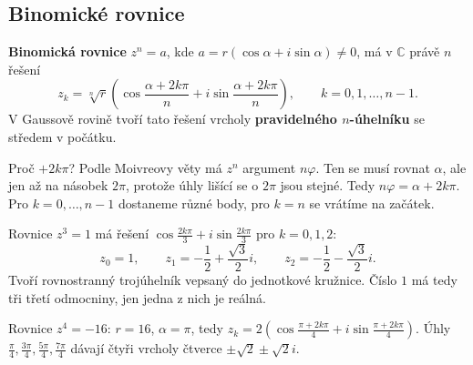 \subsection{Binomické rovnice}\label{sec:binomicke-rovnice}

\begin{definitionbox}
  \textbf{Binomická rovnice} $z^n = a$, kde $a = r(\cos\alpha + i\sin\alpha)\neq 0$, má v $\mathbb{C}$ právě $n$ řešení
  \begin{equation*}
    z_k = \sqrt[n]{r}\left(\cos\frac{\alpha + 2k\pi}{n} + i\sin\frac{\alpha + 2k\pi}{n}\right),\qquad k = 0, 1, \ldots, n - 1.
  \end{equation*}
  V Gaussově rovině tvoří tato řešení vrcholy \textbf{pravidelného $n$-úhelníku} se středem v počátku.
\end{definitionbox}

Proč $+2k\pi$? Podle Moivreovy věty má $z^n$ argument $n\varphi$. Ten se musí rovnat $\alpha$, ale jen až na násobek $2\pi$, protože úhly lišící se o $2\pi$ jsou stejné. Tedy $n\varphi = \alpha + 2k\pi$. Pro $k = 0, \ldots, n - 1$ dostaneme různé body, pro $k = n$ se vrátíme na začátek.

\begin{example}
  Rovnice $z^3 = 1$ má řešení $\cos\frac{2k\pi}{3} + i\sin\frac{2k\pi}{3}$ pro $k = 0, 1, 2$:
  \begin{equation*}
    z_0 = 1,\qquad z_1 = -\frac{1}{2} + \frac{\sqrt{3}}{2}i,\qquad z_2 = -\frac{1}{2} - \frac{\sqrt{3}}{2}i.
  \end{equation*}
  Tvoří rovnostranný trojúhelník vepsaný do jednotkové kružnice. Číslo $1$ má tedy tři třetí odmocniny, jen jedna z nich je reálná.

  Rovnice $z^4 = -16$: $r = 16$, $\alpha = \pi$, tedy $z_k = 2\left(\cos\frac{\pi + 2k\pi}{4} + i\sin\frac{\pi + 2k\pi}{4}\right)$. Úhly $\frac{\pi}{4}, \frac{3\pi}{4}, \frac{5\pi}{4}, \frac{7\pi}{4}$ dávají čtyři vrcholy čtverce $\pm\sqrt{2}\pm\sqrt{2}i$.
  \begin{center}
  \end{center}
\end{example}

